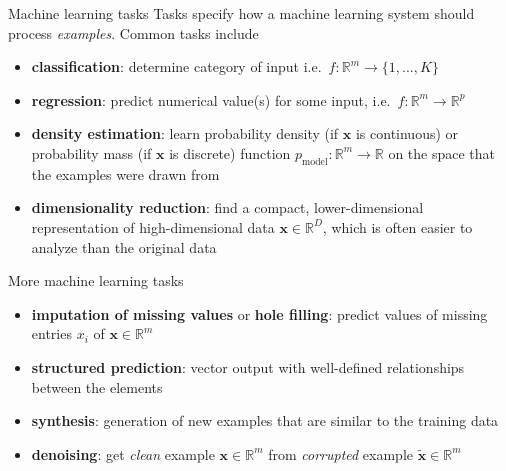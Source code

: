 \documentclass[dvipsnames]{beamer}
\def\ie{i.e.\ }
\begin{document}
		\begin{frame}{Machine learning tasks}
Tasks specify how a machine learning system should process \emph{examples}. Common tasks include %


\begin{itemize}
\item \textbf{classification}: determine category of input \ie $f: \mathbb{R}^m \rightarrow \{1, ..., K\}$ %

\item \textbf{regression}: predict numerical value(s) for some input, \ie  $f: \mathbb{R}^m \rightarrow \mathbb{R}^p$ %

\item \textbf{density estimation}: learn probability density (if $\mathbf{x}$ is continuous) or probability mass (if $\mathbf{x}$ is discrete) function $p_{\text{model}}: \mathbb{R}^m \rightarrow \mathbb{R}$ on the space that the examples were drawn from %

\item \textbf{dimensionality reduction}:  find a compact, lower-dimensional representation of high-dimensional data $\mathbf{x} \in \mathbb{R}^D$, which is often easier to analyze than the original data
\end{itemize}

\end{frame}

		\begin{frame}{More machine learning tasks}
\begin{itemize}
\item \textbf{imputation of missing values} or \textbf{hole filling}: predict values of missing entries $x_i$ of $\mathbf{x} \in \mathbb{R}^m$ %

\item \textbf{structured prediction}: vector output with well-defined relationships between the elements %

\item \textbf{synthesis}: generation of new examples that are similar to the training data %

\item \textbf{denoising}: get \emph{clean} example $\mathbf{x} \in \mathbb{R}^m$ from \emph{corrupted} example $\tilde{\mathbf{x}} \in \mathbb{R}^m$ %
\end{itemize}
\end{frame}
		
\end{document}

